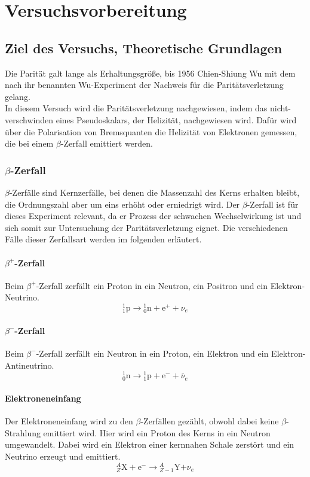 \chapter{Versuchsvorbereitung}


\section{Ziel des Versuchs, Theoretische Grundlagen}
Die Parität galt lange als Erhaltungsgröße, bis 1956 Chien-Shiung Wu mit dem nach ihr benannten Wu-Experiment der Nachweis für die Paritätsverletzung gelang.\\
In diesem Versuch wird die Paritätsverletzung nachgewiesen, indem das nicht-verschwinden eines Pseudoskalars, der Helizität, nachgewiesen wird. Dafür wird über die Polarisation von Bremsquanten die Helizität von Elektronen gemessen, die bei einem $\beta$-Zerfall emittiert werden. 
\subsection{$\beta$-Zerfall}
$\beta$-Zerfälle sind Kernzerfälle, bei denen die Massenzahl des Kerns erhalten bleibt, die Ordnungszahl aber um eins erhöht oder erniedrigt wird. Der $\beta$-Zerfall ist für dieses Experiment relevant, da er Prozess der schwachen Wechselwirkung ist und sich somit zur Untersuchung der Paritätsverletzung eignet. Die verschiedenen Fälle dieser Zerfallsart werden im folgenden erläutert.
\subsubsection{$\beta^+$-Zerfall}
Beim $\beta^+$-Zerfall zerfällt ein Proton in ein Neutron, ein Positron und ein Elektron-Neutrino.
$${}_{{1}}^{{1}}{\mathrm {p}}\to {}_{{0}}^{{1}}{\mathrm {n}}+{\mathrm {e}}^{{+}}+\nu _{e}$$

\subsubsection{$\beta^-$-Zerfall}
Beim $\beta^-$-Zerfall zerfällt ein Neutron in ein Proton, ein Elektron und ein Elektron-Antineutrino.
$${}_{{0}}^{{1}}{\mathrm {n}}\to {}_{{1}}^{{1}}{\mathrm {p}}+{\mathrm {e}}^{{-}}+\overline {\nu }_{e}$$
\subsubsection{Elektroneneinfang}
Der Elektroneneinfang wird zu den $\beta$-Zerfällen gezählt, obwohl dabei keine $\beta$-Strahlung emittiert wird. Hier wird ein Proton des Kerns in ein Neutron umgewandelt. Dabei wird ein Elektron einer kernnahen Schale zerstört und ein Neutrino erzeugt und emittiert. 
$${\displaystyle {}_{Z}^{A}\mathrm {X} +\mathrm {e} ^{-}\to {}_{Z-1}^{A}\mathrm {Y} \mathrm {+} \nu _{e}}$$

